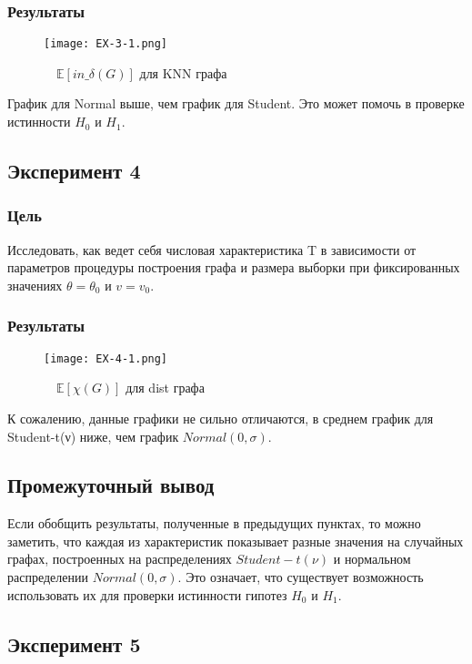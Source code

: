 \documentclass[a4paper, 12pt]{article}
\begin{document}
\subsubsection{Результаты}
\begin{figure}[H]
    \centering
    \texttt{[image: EX-3-1.png]}
    \caption{$\quad \mathbb{E}[in\_\delta(G)]$ для KNN графа}
    \label{fig:uml}
\end{figure}
График для Normal выше, чем график для Student. Это может помочь в проверке истинности $H_0$ и $H_1$. \\


\newpage
\subsection{Эксперимент 4}
\subsubsection{Цель}
Исследовать, как ведет себя числовая характеристика T в зависимости
от параметров процедуры построения графа и размера выборки при
фиксированных значениях $\theta = \theta_0$ и $v = v_0$.\\
\subsubsection{Результаты}
\begin{figure}[H]
    \centering
    \texttt{[image: EX-4-1.png]}
    \caption{$\quad \mathbb{E}[\chi(G)]$ для dist графа}
    \label{fig:uml}
\end{figure}
К сожалению, данные графики не сильно отличаются, в среднем график для Student-t(ν) ниже, чем график $Normal(0,\sigma)$.

\subsection{Промежуточный вывод}
Если обобщить результаты, полученные в предыдущих пунктах, то можно заметить, что каждая из характеристик показывает разные значения на случайных графах, построенных на распределениях $Student-t(ν)$ и нормальном распределении $Normal(0,\sigma)$. Это означает, что существует возможность использовать их для проверки истинности гипотез $H_0$ и $H_1$.


\newpage

\subsection{Эксперимент 5}
\end{document}
